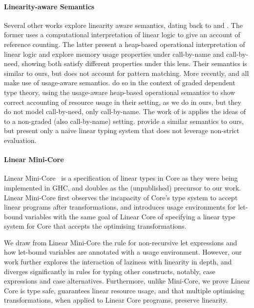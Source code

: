 \documentclass[acmsmall,review,screen]{acmart}
\begin{document}
\paragraph{Linearity-aware Semantics}
Several other works explore linearity aware semantics,
dating back to \cite{Chirimar_Gunter_Riecke_1996} and
\cite{TURNER1999231}.
The former uses a computational interpretation of linear logic to give
an account of reference counting. The latter present a heap-based
operational interpretation of linear logic and explore memory usage
properties under call-by-name and call-by-need, showing both satisfy
different properties under this lens. Their semantics is similar to
ours, but does not account for pattern matching.
More recently, \cite{DBLP:journals/pacmpl/ChoudhuryEEW21,DBLP:conf/esop/MarshallVO22} and
\cite{cite:linearhaskell} all make use of usage-aware
semantics. \citet{DBLP:journals/pacmpl/ChoudhuryEEW21} do so in the context of graded dependent
type theory, using the usage-aware heap-based operational semantics to
show correct accounting of resource usage in their setting, as we do
in ours, but they do not model
call-by-need, only call-by-name. The work of \cite{DBLP:conf/esop/MarshallVO22} is
applies the ideas of \cite{DBLP:journals/pacmpl/ChoudhuryEEW21}
to a non-graded (also call-by-name) setting. \citet{cite:linearhaskell} provide a similar semantics
to ours, but present only a naive linear typing system that does not
leverage non-strict evaluation.


\paragraph{Linear Mini-Core\label{sec:linear-mini-core}}

Linear Mini-Core~\cite{cite:minicore} is a specification of linear types in
Core as they were being implemented in GHC, and doubles as the (unpublished)
precursor to our work. Linear Mini-Core first observes the incapacity of
Core's type system to accept linear programs after transformations, and 
introduces usage environments for let-bound variables with the same goal of
Linear Core of specifying a linear type system for Core that accepts the
optimising transformations.

We draw from Linear Mini-Core the rule for non-recursive let expressions and
how let-bound variables are annotated with a usage environment. However, our
work further explores the interaction of laziness with linearity in depth, and
diverges significantly in rules for typing other constructs, notably, case expressions and
case alternatives. Furthermore, unlike Mini-Core, we prove Linear Core is type
safe, guarantees linear resource usage, and that multiple optimising
transformations, when applied to Linear Core programs, preserve linearity.
\end{document}
